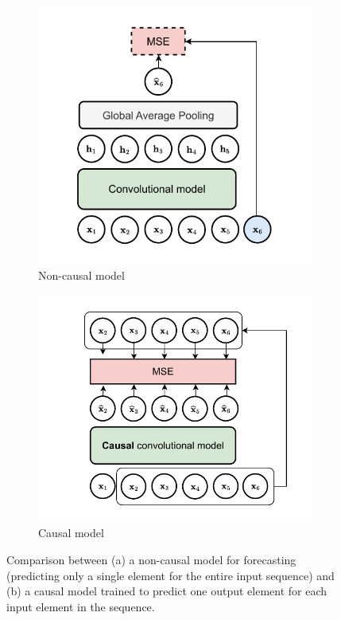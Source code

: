 \begin{figure}[t]
    \centering
    \begin{subfigure}[b]{0.45\textwidth}
    \includegraphics[width=1.0\textwidth]{images/forecasting-Page-1}
    \caption{Non-causal model}
    \label{fig:forecasting_a}
    \end{subfigure}
    \begin{subfigure}[b]{0.48\textwidth}
    \includegraphics[width=1.0\textwidth]{images/forecasting-Pagina-2}
    \caption{Causal model}
    \label{fig:forecasting_b}
    \end{subfigure}
    \caption{Comparison between (a) a non-causal model for forecasting (predicting only a single element for the entire input sequence) and (b) a causal model trained to predict one output element for each input element in the sequence.}
    \label{fig:forecasting}
\end{figure}


